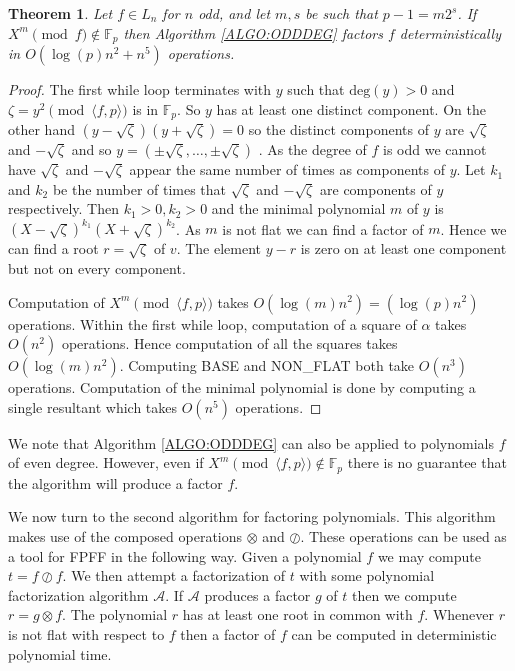 \documentclass{article}
\newcounter{dummy} \numberwithin{dummy}{section}
\theoremstyle{plain}
\newtheorem{thm}[dummy]{Theorem}
\theoremstyle{definition}
\def\Fp {{ \mathbb{F} _ {p} }}
\def\mcA  {{ \mathcal{A}}}
\def\deg {{ \mathrm{deg}}}
\begin{document}
		\begin{thm}
    \label{THM:ODDDEGTIME}
        Let $f \in L_n$ for $n$ odd, and let $m,s$ be such that $p-1=m2^s$. If $X^m \pmod f \not\in \Fp$ then Algorithm \ref{ALGO:ODDDEG} factors $f$ deterministically in $O( \log(p)n^2 + n^5)$ operations. 
    \end{thm}
		
		\begin{proof}
		    The first while loop terminates with $y$ such that $\deg(y)>0$ and $\zeta=y^2 \pmod {\langle f,p \rangle}$ is in $\Fp$. So $y$ has at least one distinct component. On the other hand $(y-\sqrt{\zeta})(y+\sqrt{\zeta})=0$ so the distinct components of $y$ are $\sqrt{\zeta}$ and $-\sqrt{\zeta}$ and so $y=(\pm \sqrt{\zeta},\ldots,\pm \sqrt{\zeta})$ . As the degree of $f$ is odd we cannot have $\sqrt{\zeta}$ and $-\sqrt{\zeta}$ appear the same number of times as components of $y$. Let $k_1$ and $k_2$ be the number of times that $\sqrt{\zeta}$ and $-\sqrt{\zeta}$ are components of $y$ respectively. Then $k_1>0,k_2>0$ and the minimal polynomial $m$ of $y$ is $(X-\sqrt{\zeta})^{k_1} (X+\sqrt{\zeta})^{k_2}$. As $m$ is not flat we can find a factor of $m$. Hence we can find a root $r=\sqrt{\zeta}$ of $v$. The element $y-r$ is zero on at least one component but not on every component. 
				
		    Computation of $X^m \pmod {\langle f,p \rangle}$ takes $O( \log(m)n^2 )=(\log(p)n^2)$ operations. Within the first while loop, computation of a square of $\alpha$ takes $O(n^2)$ operations. Hence computation of all the squares takes $O(\log(m)n^2)$. Computing BASE and NON\_FLAT both take $O(n^3)$ operations. Computation of the minimal polynomial is done by computing a single resultant which takes $O(n^5)$ operations.
		\end{proof}
		We note that Algorithm \ref{ALGO:ODDDEG} can also be applied to polynomials $f$ of even degree. However, even if $X^m \pmod{\langle f,p \rangle} \not\in \Fp$ there is no guarantee that the algorithm will produce a factor $f$. 
		
		We now turn to the second algorithm for factoring polynomials. This algorithm makes use of the composed operations $\otimes$ and $\oslash$. These operations can be used as a tool for FPFF in the following way. Given a polynomial $f$ we may compute $t=f \oslash f$. We then attempt a factorization of $t$ with some polynomial factorization algorithm $\mcA$. If $\mcA$ produces a factor $g$ of $t$ then we compute $r=g \otimes f$. The polynomial $r$ has at least one root in common with $f$. Whenever $r$ is not flat with respect to $f$ then a factor of $f$ can be computed in deterministic polynomial time.
		
\end{document}
